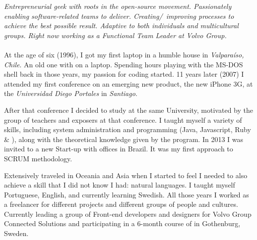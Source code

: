 \documentclass[10pt,a4paper]{article}
\begin{document}
\vspace{-1.3em}  %
\begin{multicols}{2}  %
\noindent \emph{Entrepreneurial geek with roots in the open-source movement. Passionately enabling software-related teams to deliver. Creating/\ improving processes to achieve the best possible result. Adaptive to both individuals and multicultural groups. Right now working as a Functional Team Leader at Volvo Group.}
\\
\\
At the age of six (1996), I got my first laptop in a humble house in \emph{Valparaíso, Chile}.  An old one with  on a  laptop. Spending hours playing with the MS-DOS shell back in those years, my passion for coding started. 11 years later (2007) I attended my first conference on an emerging new product, the new iPhone 3G, at the \emph{Universidad Diego Portales} in \emph{Santiago}.

After that conference I decided to study at the same University, motivated by the group of teachers and exposers at that conference. I taught myself a variety of skills, including system administration and programming (Java, Javascript, Ruby \& \CPP), along with the theoretical knowledge given by the program. In 2013 I was invited to a new Start-up with offices in Brazil. It was my first approach to SCRUM methodology.

Extensively traveled in Oceania and Asia when I started to feel I needed to also achieve a skill that I did not know I had: natural languages. I taught myself Portuguese, English, and currently learning Swedish. All those years I  worked as a freelancer for different projects and different groups of people and cultures. Currently leading a group of Front-end developers and designers for Volvo Group Connected Solutions and participating in a 6-month course of {\href{https://www.globalleadership.com/en/}{}} in Gothenburg, Sweden.



\end{multicols}


\spacedhrule{0em}{-0.4em}

\end{document}
